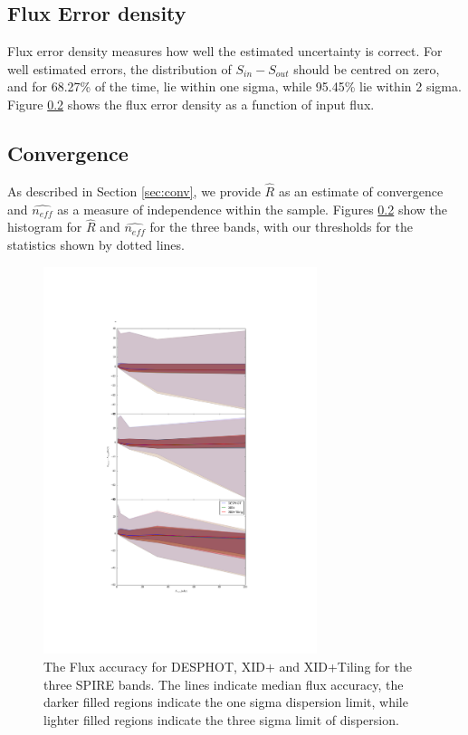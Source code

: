 \documentclass[useAMS,usenatbib]{mn2e}
\begin{document}
\subsection{Flux Error density}
Flux error density measures how well the estimated uncertainty is correct. For well estimated errors, the distribution of $S_{in} - S_{out}$ should be centred on zero, and for 68.27\% of the time, lie within one sigma, while 95.45\% lie within 2 sigma. Figure \ref{} shows the flux error density as a function of input flux. 


\subsection{Convergence}
As described in Section \ref{sec:conv}, we provide $\hat{R}$ as an estimate of convergence and $\hat{n_{eff}}$ as a measure of independence within the sample. Figures \ref{} show the histogram for $\hat{R}$ and $\hat{n_{eff}}$ for the three bands, with our thresholds for the statistics shown by dotted lines. 

\begin{figure}
\includegraphics[width=8cm]{./Figures/Flux_accuracy}
\caption{The Flux accuracy for DESPHOT, XID+ and XID+Tiling for the three SPIRE bands. The lines indicate median flux accuracy, the darker filled regions indicate the one sigma dispersion limit, while lighter filled regions indicate the three sigma limit of dispersion.}\label{Fig:flux_acc}
\end{figure}
\end{document}

